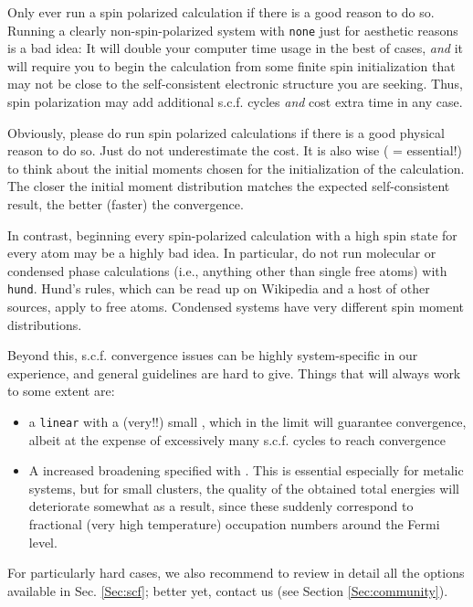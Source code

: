 Only ever run a spin polarized calculation if there is a good reason
to do so. Running a clearly non-spin-polarized system with
 \texttt{none} just for aesthetic reasons is a bad
idea: It will double your computer time usage in the best of cases,
\emph{and} it will require you to begin the calculation from some
finite spin initialization that may not be close to the
self-consistent electronic structure you are seeking. Thus, spin
polarization may add additional s.c.f. cycles \emph{and} cost extra
time in any case.

Obviously, please do run spin polarized calculations if there is a
good physical reason to do so. Just do not underestimate the cost. It
is also wise ( = essential!) to think about the initial moments chosen
for the initialization of the calculation. The closer the initial
moment distribution matches the expected self-consistent result, the
better (faster) the convergence.

In contrast, beginning every spin-polarized calculation with a high
spin state for every atom may be a highly bad idea. In particular, do
not run molecular or condensed phase calculations (i.e., anything
other than single free atoms) with 
\texttt{hund}. Hund's rules, which can be read up on Wikipedia and a
host of other sources, apply to free atoms. Condensed systems have
very different spin moment distributions.

Beyond this, s.c.f. convergence issues can be highly system-specific
in our experience, and general guidelines are hard to give. Things
that will always work to some extent are:
\begin{itemize}
  \item a \texttt{linear}  with a (very!!) small
    , which in the limit will guarantee
    convergence, albeit at the expense of excessively many
    s.c.f. cycles to reach convergence
  \item A increased broadening specified with
    . This is essential especially for
    metalic systems, but for small clusters, the quality of the
    obtained total energies will deteriorate somewhat as a result,
    since these suddenly correspond to fractional (very high
    temperature) occupation numbers around the Fermi level.
\end{itemize}
For particularly hard cases, we also recommend to review in detail
all the options available in Sec. \ref{Sec:scf}; better yet, contact
us (see Section \ref{Sec:community}).

